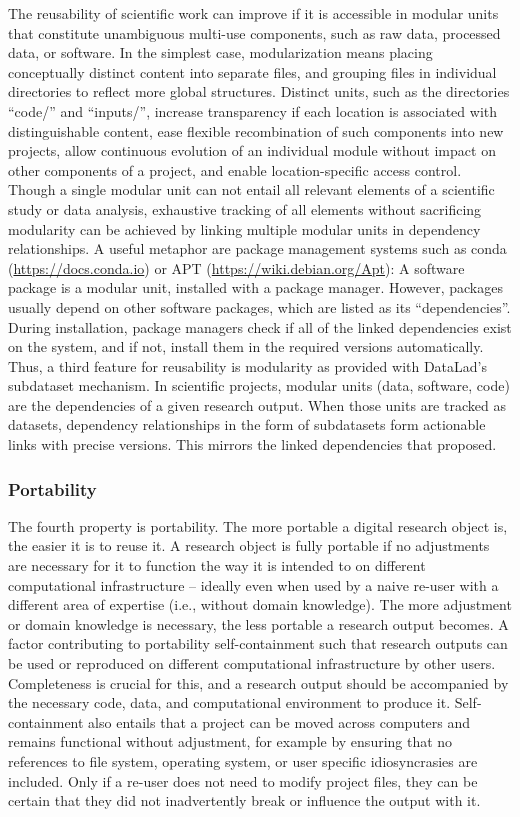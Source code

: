 The reusability of scientific work can improve if it is accessible in modular units that constitute unambiguous multi-use components, such as raw data, processed data, or software.
In the simplest case, modularization means placing conceptually distinct content into separate files, and grouping files in individual directories to reflect more global structures.
Distinct units, such as the directories ``code/'' and ``inputs/'', increase transparency if each location is associated with distinguishable content, ease flexible recombination of such components into new projects, allow continuous evolution of an individual module without impact on other components of a project, and enable location-specific access control.
Though a single modular unit can not entail all relevant elements of a scientific study or data analysis, exhaustive tracking of all elements without sacrificing modularity can be achieved by linking multiple modular units in dependency relationships.
A useful metaphor are package management systems such as conda (\url{https://docs.conda.io}) or APT (\url{https://wiki.debian.org/Apt}): A software package is a modular unit, installed with a package manager.
However, packages usually depend on other software packages, which are listed as its ``dependencies''.
During installation, package managers check if all of the linked dependencies exist on the system, and if not, install them in the required versions automatically.
Thus, a third feature for reusability is modularity as provided with DataLad's subdataset mechanism.
In scientific projects, modular units (data, software, code) are the dependencies of a given research output.
When those units are tracked as datasets, dependency relationships in the form of subdatasets form actionable links with precise versions.
This mirrors the linked dependencies that \citet{bechhofer2010research} proposed.


\subsubsection{Portability}

The fourth property is portability.
The more portable a digital research object is, the easier it is to reuse it.
A research object is fully portable if no adjustments are necessary for it to function the way it is intended to on different computational infrastructure -- ideally even when used by a naive re-user with a different area of expertise (i.e., without domain knowledge).
The more adjustment or domain knowledge is necessary, the less portable a research output becomes.
A factor contributing to portability self-containment such that research outputs can be used or reproduced on different computational infrastructure by other users.
Completeness is crucial for this, and a research output should be accompanied by the necessary code, data, and computational environment to produce it.
Self-containment also entails that a project can be moved across computers and remains functional without adjustment, for example by ensuring that no references to file system, operating system, or user specific idiosyncrasies are included.
Only if a re-user does not need to modify project files, they can be certain that they did not inadvertently break or influence the output with it.

